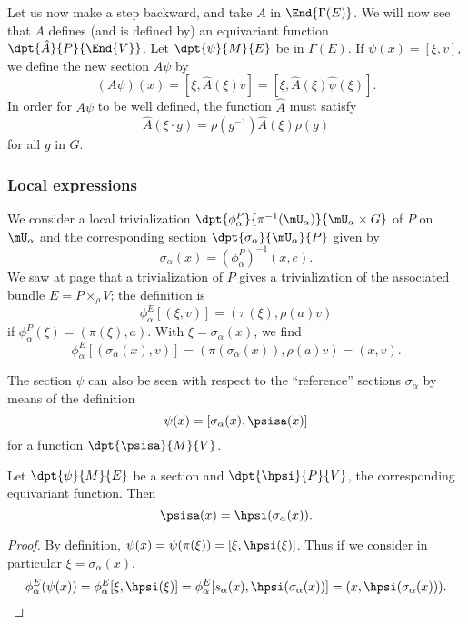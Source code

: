 Let us now make a step backward, and take $A$ in $\End{\Gamma(E)}$. We will now see that $A$ defines (and is defined by) an equivariant function $\dpt{\hat A}{P}{\End{V}}$. Let $\dpt{\psi}{M}{E}$ be in $\Gamma(E)$. If $\psi(x)=[\xi,v]$, we define the new section $A\psi$ by
\[
         (A\psi)(x)=[\xi,\hat A(\xi)v]=[\xi,\hat A(\xi)\hat\psi(\xi)].
\]
In order for $A\psi$ to be well defined, the function $\hat A$ must satisfy
\begin{equation}
     \hat A(\xi\cdot g)=\rho(g^{-1})\hat A(\xi)\rho(g)                 \label{equivA}
\end{equation}
for all $g$ in $G$.

\subsubsection{Local expressions}

We consider a local trivialization $\dpt{\phi^P_{\alpha}}{\pi^{-1}(\mU_{\alpha})}{\mU_{\alpha}\times G}$ of $P$ on $\mU_{\alpha}$ and the corresponding section $\dpt{\sigma_{\alpha}}{\mU_{\alpha}}{P}$ given by 
\[
\sigma_{\alpha}(x)=(\phi^P_{\alpha})^{-1}(x,e).
\]
We saw at page \pageref{eq:triv_P_E} that a trivialization of $P$ gives a trivialization of the associated bundle $E=P\times_{\rho} V$; the definition is
\begin{equation}
  \phi^E_{\alpha}[(\xi,v)]=( \pi(\xi),\rho(a)v )
\end{equation}
if $\phi_{\alpha}^P(\xi)=(\pi(\xi),a)$. With $\xi=\sigma_{\alpha}(x)$, we find
\begin{equation}
   \phi^E_{\alpha}[(\sigma_{\alpha}(x),v)]=(  \pi(\sigma_{\alpha}(x)),\rho(a)v  )
                                 =(x,v).
\end{equation}

The section $\psi$ can also be seen with respect to the ``reference''{} sections $\sigma_{\alpha}$ by means of the definition
\begin{equation}\label{eq:def:psisa}
  \psi(x)=[\sigma_{\alpha}(x),\psisa(x)]
\end{equation}
for a function $\dpt{\psisa}{M}{V}$.

\begin{lemma}
Let $\dpt{\psi}{M}{E}$ be a section and $\dpt{\hpsi}{P}{V}$, the corresponding equivariant function. Then
\[
   \psisa(x)=\hpsi(\sigma_{\alpha}(x)).
\]
\end{lemma}

\begin{proof}
By definition, $\psi(x)=\psi(\pi(\xi))=[\xi,\hpsi(\xi)]$.  Thus if we consider in particular $\xi=\sigma_{\alpha}(x)$,
\begin{equation}
  \phi^E_{\alpha}(\psi(x))=\phi^E_{\alpha}[\xi,\hpsi(\xi)]
                        =\phi^E_{\alpha}[s_{\alpha}(x),\hpsi(\sigma_{\alpha}(x))]
                        =(x,\hpsi(\sigma_{\alpha}(x))).
\end{equation}

\end{proof}

